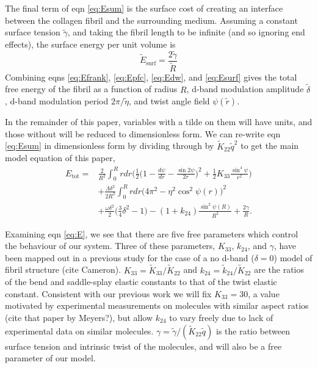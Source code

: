 \documentclass[%
 reprint,
 amsmath,amssymb,
 aps,
]{revtex4-1}
\begin{document}
The final term of eqn \ref{eq:Esum} is the surface cost of creating an interface between the collagen fibril and the surrounding medium. Assuming a constant surface tension $\tilde{\gamma}$, and taking the fibril length to be infinite (and so ignoring end effects), the surface energy per unit volume is
\begin{equation}\label{eq:Esurf}
\tilde{E}_{\mathrm{surf}}=\frac{2\tilde{\gamma}}{\tilde{R}}
\end{equation}
Combining eqns \ref{eq:Efrank}, \ref{eq:Epfc}, \ref{eq:Edw}, and \ref{eq:Esurf} gives the total free energy of the fibril as a function of radius $R$, d-band modulation amplitude $\tilde{\delta}$, d-band modulation period $2\pi/\tilde{\eta}$, and twist angle field $\psi(\tilde{r})$.

In the remainder of this paper, variables with a tilde on them will have units, and those without will be reduced to dimensionless form. We can re-write eqn \ref{eq:Esum} in dimensionless form by dividing through by $\tilde{K}_{22}\tilde{q}^2$ to get the main model equation of this paper,
\begin{align}\label{eq:E}
E_{\mathrm{tot}}=&\frac{2}{R^2}\int_0^Rrdr\bigg(\frac{1}{2}\bigg(1-\frac{d\psi}{dr}-\frac{\sin2\psi}{2r}\bigg)^2+\frac{1}{2}K_{33}\frac{\sin^4\psi}{r^2}\bigg)\nonumber\\
&+\frac{\Lambda\delta^2}{2R^2}\int_0^Rrdr\big(4\pi^2-\eta^2\cos^2\psi(r)\big)^2\nonumber\\
&+\frac{\omega\delta^2}{2}\bigg(\frac{3}{4}\delta^2-1\bigg)-(1+k_{24})\frac{\sin^2\psi(R)}{R^2}+\frac{2\gamma}{R}.
\end{align}

Examining eqn \ref{eq:E}, we see that there are five free parameters which control the behaviour of our system. Three of these parameters, $K_{33}$, $k_{24}$, and $\gamma$, have been mapped out in a previous study for the case of a no d-band ($\delta=0$) model of fibril structure (cite Cameron). $K_{33}=\tilde{K}_{33}/\tilde{K}_{22}$ and $k_{24}=\tilde{k}_{24}/\tilde{K}_{22}$ are the ratios of the bend and saddle-splay elastic constants to that of the twist elastic constant. Consistent with our previous work we will fix $K_{33}=30$, a value motivated by experimental measurements on molecules with similar aspect ratios (cite that paper by Meyers?), but allow $k_{24}$ to vary freely due to lack of experimental data on similar molecules. $\gamma=\tilde{\gamma}/(\tilde{K}_{22}\tilde{q})$ is the ratio between surface tension and intrinsic twist of the molecules, and will also be a free parameter of our model.
\end{document}
